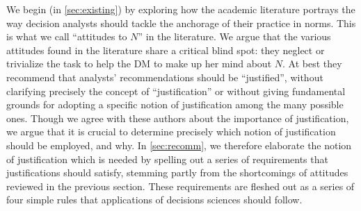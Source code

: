 \documentclass[preprint, french, english, 11pt, authoryear]{elsarticle}%
\newcommand{\adv}{\mathscr{N}}
\begin{document}
\begin{changebar}
We begin (in \cref{sec:existing}) by exploring how the academic literature portrays the way decision analysts should tackle the anchorage of their practice in norms. This is what we call ``attitudes to $N$'' in the literature. %
We argue that the various attitudes found in the literature share a critical blind spot: they neglect or trivialize the task to help the \ac{DM}
 to make up her mind about $N$. At best they recommend that analysts' recommendations should be ``justified'', without clarifying precisely the concept of ``justification'' or without giving fundamental grounds for adopting a specific notion of justification among the many possible ones.
Though we agree with these authors about the importance of justification, we argue that it is crucial to determine precisely which notion of justification should be employed, and why. 
In \cref{sec:recomm}, we therefore elaborate the notion of justification which is needed by spelling out a series of requirements that justifications should satisfy, stemming partly from the shortcomings of attitudes reviewed in the previous section.
These requirements are fleshed out as a series of four simple rules that applications of decisions sciences should follow.%


\end{changebar}
\end{document}
